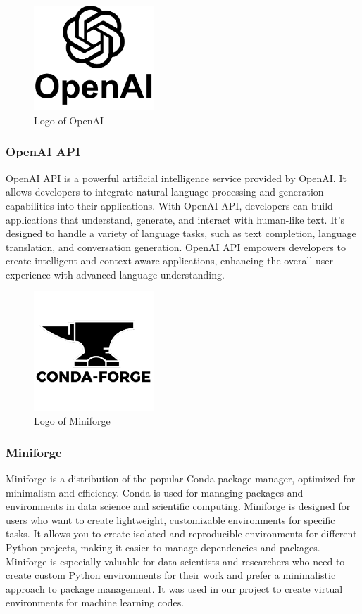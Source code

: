 \documentclass[conference]{IEEEtran}
\begin{document}
        \begin{figure}[htbp]
        \centerline{\includegraphics[width=4.5cm]{Images/logo/openai.png}}
        \label{fig}
        \caption{Logo of OpenAI}
        \end{figure}
        \subsubsection{OpenAI API}
        OpenAI API is a powerful artificial intelligence service provided by OpenAI. It allows developers to integrate natural language processing and generation capabilities into their applications. With OpenAI API, developers can build applications that understand, generate, and interact with human-like text. It's designed to handle a variety of language tasks, such as text completion, language translation, and conversation generation. OpenAI API empowers developers to create intelligent and context-aware applications, enhancing the overall user experience with advanced language understanding.\\

        \begin{figure}[htbp]
        \centerline{\includegraphics[width=4.5cm]{Images/logo/forge.png}}
        \label{fig}
        \caption{Logo of Miniforge}
        \end{figure}
        \subsubsection{Miniforge}
        Miniforge is a distribution of the popular Conda package manager, optimized for minimalism and efficiency. Conda is used for managing packages and environments in data science and scientific computing. Miniforge is designed for users who want to create lightweight, customizable environments for specific tasks. It allows you to create isolated and reproducible environments for different Python projects, making it easier to manage dependencies and packages. Miniforge is especially valuable for data scientists and researchers who need to create custom Python environments for their work and prefer a minimalistic approach to package management. It was used in our project to create virtual environments for machine learning codes.\\
\end{document}
